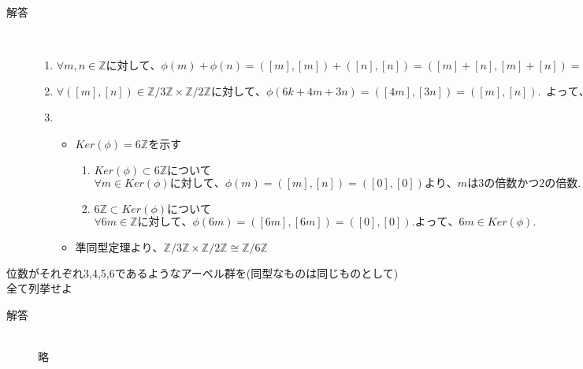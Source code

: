 \documentclass[dvipdfmx]{jsarticle}
\begin{document}
\begin{description}
  \item[解答]　\mbox{} \\
  \begin{enumerate}
    \item $\forall m,n \in \mathbb{Z}に対して、\phi(m) + \phi(n) = ([m],[m]) + ([n],[n]) = ([m]+[n],[m]+[n]) = ([m+n],[m+n]) = \phi(m+n).よって準同型$

    \item $\forall ([m],[n])\in \mathbb{Z}/3\mathbb{Z} \times \mathbb{Z}/2\mathbb{Z}に対して、\phi(6k+4m+3n)=([4m],[3n])=([m],[n]). \ \ よって、\phi は全射.$

    \item
    \begin{itemize}
      \item $Ker(\phi) = 6\mathbb{Z}を示す$
      \begin{enumerate}
        \item $Ker(\phi) \subset 6\mathbb{Z}について$\\
        $\forall m \in Ker(\phi)に対して、\phi(m) = ([m], [n]) = ([0],[0])より、mは3の倍数かつ2の倍数. \ よって、mは6の倍数. \ したがって、m \in 6\mathbb{Z}$

        \item $6\mathbb{Z} \subset Ker(\phi)について$\\
        $\forall 6m \in \mathbb{Z}に対して、\phi(6m) = ([6m],[6m]) = ([0],[0]).よって、6m \in Ker(\phi).$
      \end{enumerate}

      \item $準同型定理より、\mathbb{Z}/3\mathbb{Z} \times \mathbb{Z}/2\mathbb{Z} \cong \mathbb{Z}/6\mathbb{Z}$
    \end{itemize}
  \end{enumerate}
\end{description}


\begin{tcolorbox}[colframe=black!50,colback=white,colbacktitle=black!50,coltitle=white,fonttitle=\bfseries\sffamily,title=問題5]
位数がそれぞれ3,4,5,6であるようなアーベル群を(同型なものは同じものとして)全て列挙せよ
\end{tcolorbox}

\begin{description}
  \item[解答]　\mbox{}\\
  略
\end{description}
\end{document}
